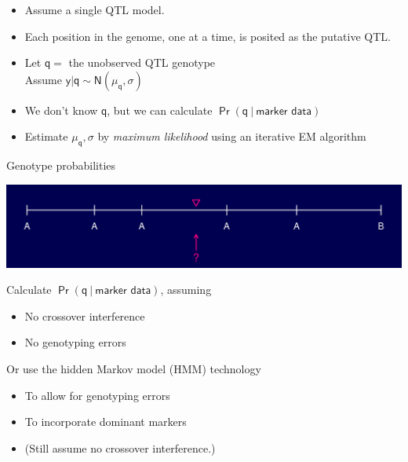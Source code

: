 \documentclass[12pt]{article}
\newcommand{\headsize}{\fontsize{35}{35} \selectfont}
\newcommand{\smallersize}{\fontsize{20}{25} \selectfont}
\begin{document}
\smallersize
\hfill \begin{minipage}{9.5in}
\begin{itemize}
\itemsep24pt
\setlength{\rightskip}{0pt plus 1fil} %
  \item Assume a {\color{mypink} single} QTL model.
  \item Each position in the genome, one at a time, is posited as the
  putative QTL.
  \item Let $\mathsf{q = }$ the unobserved QTL genotype \\
        Assume $\mathsf{y | q \sim N(\mu_q, \sigma)}$
  \item We don't know $\mathsf{q}$, but we can calculate
    $\mathsf{\Pr(q \ | \ \text{marker data})}$
  \item Estimate $\mathsf{\mu_q, \sigma}$ by \emph{maximum likelihood}
    using an iterative EM algorithm
\end{itemize}
\end{minipage}



\newpage

\headsize \color{myyellow}
\hfill \begin{minipage}{5.75in}
\centering
Genotype probabilities
\end{minipage}

\vspace{15mm}

\centerline{\includegraphics{FigsA/genoprob1.pdf}}

\vspace{15mm}

\hfill
\begin{minipage}{10in}
\color{mywhite} \smallersize
Calculate {\color{myblue} $\mathsf{\Pr(q \ | \ \text{marker data})}$}, assuming
\begin{itemize}
\item No crossover interference
\item No genotyping errors
\end{itemize}

\vspace{10mm}

Or use the {\color{mypink} hidden Markov model (HMM)} technology
\begin{itemize}
\item To allow for genotyping errors
\item To incorporate dominant markers
\item {\color{myblue} (Still assume no crossover interference.)}
\end{itemize}
\end{minipage}
\end{document}
